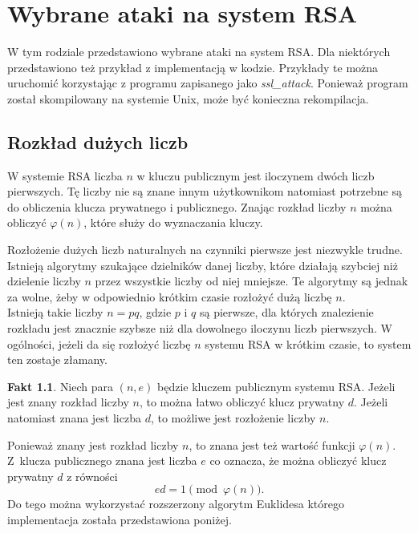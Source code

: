 \documentclass[12pt,twoside,a4]{mwbk}
\theoremstyle{definition}
\newtheorem{fakt}{Fakt}[chapter]
\begin{document}

\chapter{Wybrane ataki na system RSA}
W tym rodziale przedstawiono wybrane ataki na system RSA. Dla niektórych przedstawiono też przykład z implementacją w kodzie. Przykłady te można uruchomić korzystając z programu zapisanego jako \textit{ssl\_attack}. Ponieważ program został skompilowany na systemie Unix, może być konieczna rekompilacja.

\section{Rozkład dużych liczb}
W systemie RSA liczba $n$ w kluczu publicznym jest iloczynem dwóch liczb pierwszych. Tę liczby nie są znane innym użytkownikom natomiast potrzebne są do obliczenia klucza prywatnego i publicznego. Znając rozkład liczby $n$ można obliczyć $\varphi(n)$, które służy do wyznaczania kluczy. \\ \par

Rozłożenie dużych liczb naturalnych na czynniki pierwsze jest niezwykle trudne. Istnieją algorytmy szukające dzielników danej liczby, które działają szybciej niż dzielenie liczby $n$ przez wszystkie liczby od niej mniejsze. Te algorytmy są jednak za wolne, żeby w odpowiednio krótkim czasie rozłożyć dużą liczbę $n$.  \\

Istnieją takie liczby $n = pq$, gdzie $p$ i $q$ są pierwsze, dla których znalezienie rozkładu jest znacznie szybsze niż dla dowolnego iloczynu liczb pierwszych. W ogólności, jeżeli da się rozłożyć liczbę $n$ systemu RSA w krótkim czasie, to system ten zostaje złamany. \\ \par

\begin{fakt}{\cite{survey}}
Niech para $(n, e)$ będzie kluczem publicznym systemu RSA. Jeżeli jest znany rozkład liczby $n$, to można łatwo obliczyć klucz prywatny $d$. Jeżeli natomiast znana jest liczba $d$, to możliwe jest rozłożenie liczby $n$.
\end{fakt}

Ponieważ znany jest rozkład liczby $n$, to znana jest też wartość funkcji $\varphi(n)$. Z~klucza publicznego znana jest liczba $e$ co oznacza, że można obliczyć klucz prywatny $d$ z równości
\[ ed = 1 \pmod{\varphi(n)}. \]
Do tego można wykorzystać rozszerzony algorytm Euklidesa którego implementacja została przedstawiona poniżej.
\end{document}
